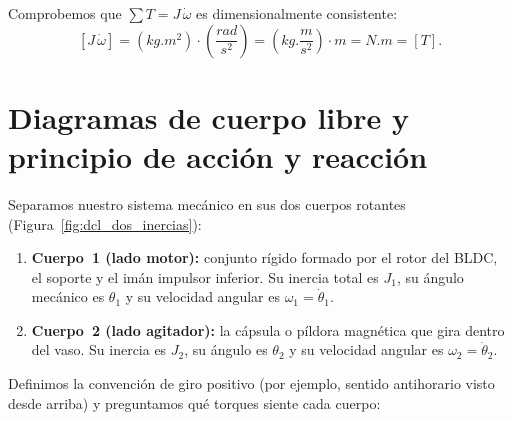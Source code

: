 \documentclass[11pt,a4paper,oneside]{book}
\begin{document}
\begin{unidades}
Comprobemos que $\sum T = J\,\dot\omega$ es dimensionalmente consistente:
\[
  [J\,\dot\omega] = (\si{kg.m^2})\cdot\left(\frac{\si{rad}}{\si{s^2}}\right)
                  = \left(\si{kg.\frac{m}{s^2}}\right)\cdot\si{m}
                  = \si{N.m} = [T].
\]
\end{unidades}

\section{Diagramas de cuerpo libre y principio de acción y reacción}

Separamos nuestro sistema mecánico en sus dos cuerpos rotantes (Figura~\ref{fig:dcl_dos_inercias}):
\begin{enumerate}
  \item \textbf{Cuerpo~1 (lado motor):} conjunto rígido formado por el rotor del
        BLDC, el soporte y el imán impulsor inferior. Su inercia total es $J_1$,
        su ángulo mecánico es $\theta_1$ y su velocidad angular es $\omega_1 = \dot\theta_1$.
  \item \textbf{Cuerpo~2 (lado agitador):} la cápsula o píldora magnética que
        gira dentro del vaso. Su inercia es $J_2$, su ángulo es $\theta_2$ y su
        velocidad angular es $\omega_2 = \dot\theta_2$.
\end{enumerate}

Definimos la convención de giro positivo (por ejemplo, sentido antihorario visto
desde arriba) y preguntamos qué torques siente cada cuerpo:
\end{document}
